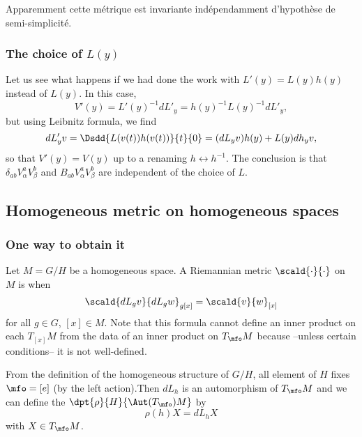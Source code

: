\begin{probleme}
Apparemment cette métrique est invariante indépendamment d'hypothèse de semi-simplicité.
\end{probleme}

\subsubsection{The choice of \texorpdfstring{$L(y)$}{L(y)}}

Let us see what happens if we had done the work with $L'(y)=L(y)h(y)$ instead of $L(y)$. In this case,
\[
   V'(y)=L'(y)^{-1} dL'_y=h(y)^{-1} L(y)^{-1} dL'_y,
\]
but using Leibnitz formula, we find
\begin{equation}
   dL'_yv=\Dsdd{L(v(t))h(v(t))}{t}{0}
         =(dL_yv)h(y)+L(y)dh_yv,
\end{equation}
so that $V'(y)=V(y)$ up to a renaming $h\leftrightarrow h^{-1}$. The conclusion is that $\delta_{ab}V_{\alpha}^a V_{\beta}^b$ and $B_{ab}V_{\alpha}^aV_{\beta}^b$ are independent of the choice of $L$.

\subsection{Homogeneous metric on homogeneous spaces}

\subsubsection{One way to obtain it}

Let $M=G/H$ be a homogeneous space. A Riemannian metric $\scald{\cdot}{\cdot}$ on $M$ is  when
\begin{equation}\label{eq:def:homo_metric}
\scald{dL_gv}{dL_gw}_{g[x]}=\scald{v}{w}_{[x]}
\end{equation}
for all $g\in G$, $[x]\in M$. Note that this formula cannot define an inner product on each $T_{[x]}M$ from the data of an inner product on $T_{\mfo}M$ because --unless certain conditions-- it is not well-defined.

From the definition of the homogeneous structure of $G/H$, all element of $H$ fixes $\mfo=[e]$ (by the left action).Then $dL_h$ is an automorphism of $T_{\mfo}M$ and we can define the  $\dpt{\rho}{H}{\Aut(T_{\mfo})M}$ by
\[
   \rho(h)X=dL_hX
\]
with $X\in T_{\mfo}M$.

